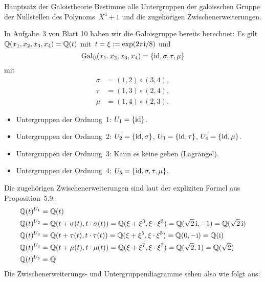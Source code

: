 \documentclass{algblatt}
\begin{document}
\begin{aufgabe}{Hauptsatz der Galoistheorie}
Bestimme alle Untergruppen der galoisschen Gruppe der Nullstellen des
Polynoms~$X^4 + 1$ und die zugehörigen Zwischenerweiterungen.

\begin{loesung}
In Aufgabe~3 von Blatt 10 haben wir die Galoisgruppe bereits berechnet: Es
gilt~$\mathbb{Q}(x_1,x_2,x_3,x_4) = \mathbb{Q}(t)$ mit~$t = \xi := \exp(2\pi\mathrm{i}/8)$ und
\[ \mathrm{Gal}_{\mathbb{Q}}(x_1,x_2,x_3,x_4) =
  \left\{ \mathrm{id}, \sigma, \tau, \mu \right\} \]
mit
\begin{align*}
  \sigma &= (1,2)\circ(3,4), \\
  \tau &= (1,3)\circ(2,4), \\
  \mu &= (1,4)\circ(2,3).
\end{align*}
\begin{itemize}
\item Untergruppen der Ordnung~1: $U_1 = \{\mathrm{id}\}$.
\item Untergruppen der Ordnung~2: $U_2 = \{\mathrm{id},\sigma\}$, $U_3 = \{\mathrm{id},\tau\}$,
$U_4 = \{\mathrm{id},\mu\}$.
\item Untergruppen der Ordnung~3: Kann es keine geben (Lagrange!).
\item Untergruppen der Ordnung~4: $U_5 = \{\mathrm{id},\sigma,\tau,\mu\}$.
\end{itemize}
Die zugehörigen Zwischenerweiterungen sind laut der expliziten Formel aus
Proposition~5.9:
\begin{align*}
  \mathbb{Q}(t)^{U_1} &= \mathbb{Q}(t) \\
  \mathbb{Q}(t)^{U_2} &= \mathbb{Q}(t + \sigma(t), t \cdot \sigma(t)) =
    \mathbb{Q}(\xi + \xi^3, \xi \cdot \xi^3) =
    \mathbb{Q}(\sqrt{2}\,\mathrm{i}, -1) =
    \mathbb{Q}(\sqrt{2}\,\mathrm{i}) \\
  \mathbb{Q}(t)^{U_3} &= \mathbb{Q}(t + \tau(t), t \cdot \tau(t)) =
    \mathbb{Q}(\xi + \xi^5, \xi \cdot \xi^5) =
    \mathbb{Q}(0, -\mathrm{i}) = \mathbb{Q}(\mathrm{i}) \\
  \mathbb{Q}(t)^{U_4} &= \mathbb{Q}(t + \mu(t), t \cdot \mu(t)) =
    \mathbb{Q}(\xi + \xi^7, \xi \cdot \xi^7) =
    \mathbb{Q}(\sqrt{2}, 1) =
    \mathbb{Q}(\sqrt{2}) \\
  \mathbb{Q}(t)^{U_5} &= \mathbb{Q}
\end{align*}
Die Zwischenerweiterungs- und Untergruppendiagramme sehen also wie folgt aus:
\begin{center}
\end{center}
\end{loesung}
\end{aufgabe}
\end{document}
